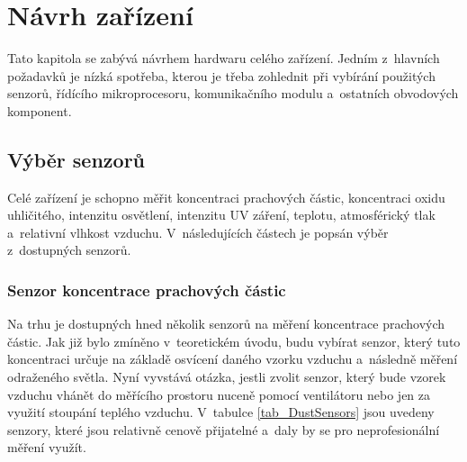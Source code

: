 \chapter{Návrh zařízení}

Tato kapitola se zabývá návrhem hardwaru celého zařízení. Jedním z~hlavních požadavků je nízká spotřeba, kterou je třeba zohlednit při vybírání použitých senzorů, řídícího mikroprocesoru, komunikačního modulu a~ostatních obvodových komponent. 

\section{Výběr senzorů}
Celé zařízení je schopno měřit koncentraci prachových částic, koncentraci oxidu uhličitého, intenzitu osvětlení, intenzitu UV záření, teplotu, atmosférický tlak a~relativní vlhkost vzduchu. V~následujících částech je popsán výběr z~dostupných senzorů.

\subsection{Senzor koncentrace prachových částic}

Na trhu je dostupných hned několik senzorů na měření koncentrace prachových částic. Jak již bylo zmíněno v~teoretickém úvodu, budu vybírat senzor, který tuto koncentraci určuje na základě osvícení daného vzorku vzduchu a~následně měření odraženého světla. Nyní vyvstává otázka, jestli zvolit senzor, který bude vzorek vzduchu vhánět do měřícího prostoru nuceně pomocí ventilátoru nebo jen za využití stoupání teplého vzduchu. V~tabulce \ref{tab_DustSensors} jsou uvedeny senzory, které jsou relativně cenově přijatelné a~daly by se pro neprofesionální měření využít.

\newcommand{\ugcm}{\micro\gram\per\cubic\meter} %

